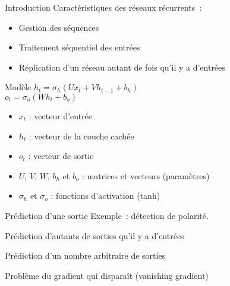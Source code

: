 \begin{frame}{Introduction}
  Caractéristiques des réseaux récurrents~:

  \begin{itemize}[<+->]
    \item Gestion des séquences
    \item Traitement séquentiel des entrées
    \item Réplication d'un réseau autant de fois qu'il y a d'entrées
  \end{itemize}
\end{frame}


\begin{frame}{Modèle}
  $h_{t}=\sigma_{h}(Ux_{t}+Vh_{t-1}+b_{h})$ \\
  $o_{t}=\sigma_{o}(Wh_{t}+b_{o})$ \\
  \begin{itemize}
  \item $x_{t}$ : vecteur d'entrée
  \item $h_t$ : vecteur de la couche cachée
  \item $o_{t}$ : vecteur de sortie
  \item $U$, $V$, $W$, $b_h$ et $b_o$ : matrices et vecteurs (paramètres)
  \item $\sigma_{h}$ et $\sigma_o$ : fonctions d'activation (tanh)
  \end{itemize}
\end{frame}

\begin{frame}{Prédiction d'une sortie}
  Exemple~: détection de polarité.

  \begin{figure}
    \centering
  \end{figure}
\end{frame}

\begin{frame}{Prédiction d'autants de sorties qu'il y a d'entrées}
\end{frame}

\begin{frame}{Prédiction d'un nombre arbitraire de sorties}
\end{frame}

\begin{frame}{Problème du gradient qui disparaît (vanishing gradient)}
\end{frame}
